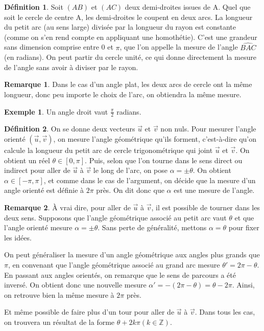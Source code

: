 \documentclass[french]{book}
\theoremstyle{plain}
\theoremstyle{definition}
\newtheorem{dfn}{Définition}[chapter]
\newtheorem{exa}{Exemple}[chapter]
\newtheorem{rmq}{Remarque}[chapter]
\theoremstyle{remark}
\begin{document}
\begin{dfn}
	Soit $(AB)$ et $(AC)$ deux demi-droites issues de A. Quel que soit le cercle de centre A, les demi-droites le coupent en deux arcs. La longueur du petit arc (au sens large) divisée par la longueur du rayon est constante (comme on s'en rend compte en appliquant une homothétie). C'est une grandeur sans dimension comprise entre 0 et $\pi$, que l'on appelle la mesure de l'angle $\widehat{BAC}$ (en radians). On peut partir du cercle unité, ce qui donne directement la mesure de l'angle sans avoir à diviser par le rayon.
\end{dfn}

\begin{rmq}
	Dans le cas d'un angle plat, les deux arcs de cercle ont la même longueur, donc peu importe le choix de l'arc, on obtiendra la même mesure.
\end{rmq}
\begin{exa}
Un angle droit vaut $\frac{\pi}{2}$ radians.
\end{exa}
\begin{dfn}
	On se donne deux vecteurs $\overrightarrow{u}$ et $\overrightarrow{v}$ non nuls. Pour mesurer l'angle orienté $(\overrightarrow{u}, \overrightarrow{v})$, on mesure l'angle géométrique qu'ils forment, c'est-à-dire qu'on calcule la longueur du petit arc de cercle trigonométrique qui joint $\overrightarrow{u}$ et $\overrightarrow{v}$. On obtient un réel $\theta \in [0, \pi]$. Puis, selon que l'on tourne dans le sens direct ou indirect pour aller de $\overrightarrow{u}$ à $\overrightarrow{v}$ le long de l'arc, on pose $\alpha = \pm \theta$. On obtient $\alpha \in [-\pi, \pi]$, et comme dans le cas de l'argument, on décide que la mesure d'un angle orienté est définie à $2\pi$ près. On dit donc que $\alpha$ est une mesure de l'angle.
\end{dfn}
\begin{rmq}
	À vrai dire, pour aller de $\overrightarrow{u}$ à $\overrightarrow{v}$, il est possible de tourner dans les deux sens. Supposons que l'angle géométrique associé au petit arc vaut $\theta$ et que l'angle orienté mesure $\alpha = \pm \theta$. Sans perte de généralité, mettons $\alpha = \theta$ pour fixer les idées. \par
On peut généraliser la mesure d'un angle géométrique aux angles plus grands que $\pi$, en convenant que l'angle géométrique associé au grand arc mesure $\theta' = 2\pi - \theta$. En passant aux angles orientés, on remarque que le sens de parcours a été inversé. On obtient donc une nouvelle mesure $\alpha' = -(2\pi - \theta) = \theta - 2\pi$. Ainsi, on retrouve bien la même mesure à $2\pi$ près.\par
Et même possible de faire plus d'un tour pour aller de $\overrightarrow{u}$ à $\overrightarrow{v}$. Dans tous les cas, on trouvera un résultat de la forme $\theta + 2k\pi (k \in \mathbb{Z})$.
\end{rmq}
\end{document}
